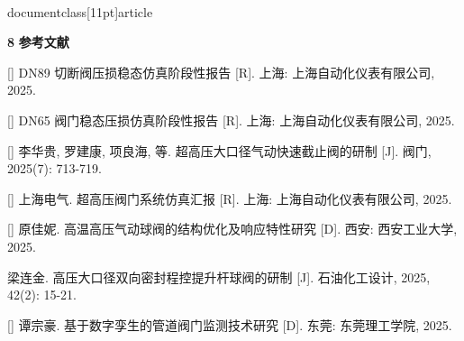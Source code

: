 \\documentclass[11pt]{article}
\begin{document}
\par
\textbf{8    }\textbf{参考文献}\par

[\cite{fe880629_9ce4_4876_a173_e24a97d827f4_基于数字孪生的管道阀门监测技术研究_谭宗豪}]  DN89 切断阀压损稳态仿真阶段性报告 [R].  上海:  上海自动化仪表有限公司, 2025.\par

[\cite{fe880629_9ce4_4876_a173_e24a97d827f4_基于数字孪生的管道阀门监测技术研究_谭宗豪}] DN65 阀门稳态压损仿真阶段性报告 [R]. 上海: 上海自动化仪表有限公司, 2025.\par

[\cite{fe880629_9ce4_4876_a173_e24a97d827f4_基于数字孪生的管道阀门监测技术研究_谭宗豪}]  李华贵,  罗建康,  项良海,  等.   超高压大口径气动快速截止阀的研制 [J].  阀门, 2025(7):  713-719.\par

[\cite{fe880629_9ce4_4876_a173_e24a97d827f4_基于数字孪生的管道阀门监测技术研究_谭宗豪}] 上海电气. 超高压阀门系统仿真汇报 [R]. 上海: 上海自动化仪表有限公司, 2025.\par

[\cite{fe880629_9ce4_4876_a173_e24a97d827f4_基于数字孪生的管道阀门监测技术研究_谭宗豪}] 原佳妮.  高温高压气动球阀的结构优化及响应特性研究 [D]. 西安:  西安工业大学, 2025.\par

\par
[\cite{fe880629_9ce4_4876_a173_e24a97d827f4_基于数字孪生的管道阀门监测技术研究_谭宗豪}] 梁连金.  高压大口径双向密封程控提升杆球阀的研制 [J]. 石油化工设计, 2025, 42(2):  15-21.\par

[\cite{fe880629_9ce4_4876_a173_e24a97d827f4_基于数字孪生的管道阀门监测技术研究_谭宗豪}] 谭宗豪. 基于数字孪生的管道阀门监测技术研究 [D]. 东莞: 东莞理工学院, 2025.\par


\printbibliography
\end{document}
